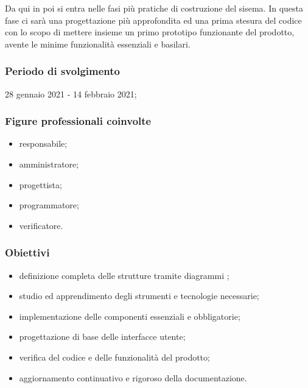 Da qui in poi si entra nelle fasi più pratiche di costruzione del sisema. In questa fase ci sarà una progettazione più approfondita ed una prima stesura del codice con lo scopo di mettere insieme un primo prototipo funzionante del prodotto, avente le minime funzionalità essenziali e basilari. 
        
        \subsubsection{Periodo di svolgimento}
        28 gennaio 2021 - 14 febbraio 2021;
        
        \subsubsection{Figure professionali coinvolte}
            \begin{itemize}
                \item responsabile;
                \item amministratore;
                \item progettista;
                \item programmatore;
                \item verificatore.
            \end{itemize}

        \subsubsection{Obiettivi}    
        \begin{itemize}
            \item definizione completa delle strutture tramite diagrammi ;
            \item studio ed apprendimento degli strumenti e tecnologie necessarie;
            \item implementazione delle componenti essenziali e obbligatorie;
            \item progettazione di base delle interfacce utente;
            \item verifica del codice e delle funzionalità del prodotto;
            \item aggiornamento continuativo e rigoroso della documentazione.
        \end{itemize}